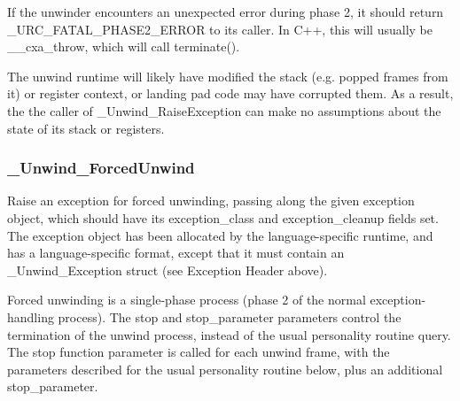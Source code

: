 If the unwinder encounters an unexpected error during phase 2, 
it should return \_URC\_FATAL\_PHASE2\_ERROR to its caller. 
In C++, this will usually be \_\_cxa\_throw, which will call terminate(). 

The unwind runtime will likely have modified the stack (e.g. popped 
frames from it) or register context, or landing pad code may have 
corrupted them. As a result, the the caller of \_Unwind\_RaiseException 
can make no assumptions about the state of its stack or registers. 

\subsubsection{\_Unwind\_ForcedUnwind}



Raise an exception for forced unwinding, passing along the given
exception object, which should have its exception\_class and
exception\_cleanup fields set. The exception object has been allocated
by the language-specific runtime, and has a language-specific format,
except that it must contain an \_Unwind\_Exception struct (see Exception
Header above).

Forced unwinding is a single-phase process (phase 2 of the normal
exception-handling process). The stop and stop\_parameter parameters
control the termination of the unwind process, instead of the usual
personality routine query. The stop function parameter is called for each
unwind frame, with the parameters described for the usual personality
routine below, plus an additional stop\_parameter.

